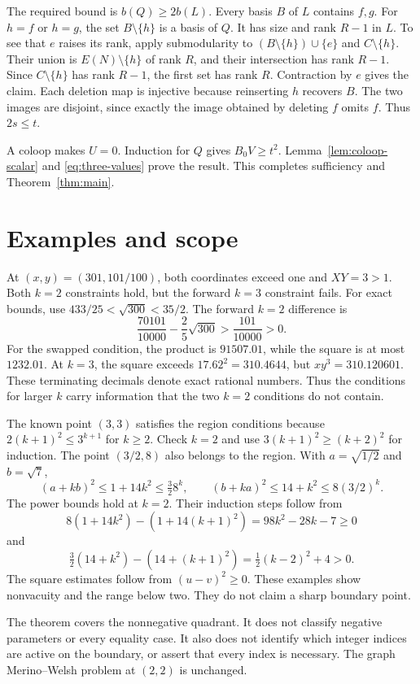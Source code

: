 \documentclass[11pt,a4paper]{article}
\begin{document}
The required bound is $b(Q)\geq2b(L)$. Every basis $B$ of $L$ contains $f,g$.
For $h=f$ or $h=g$, the set $B\setminus\{h\}$ is a basis of $Q$.
It has size and rank $R-1$ in $L$. To see that $e$ raises its rank,
apply submodularity to $(B\setminus\{h\})\cup\{e\}$ and
$C\setminus\{h\}$. Their union is $E(N)\setminus\{h\}$ of rank $R$,
and their intersection has rank $R-1$. Since $C\setminus\{h\}$ has
rank $R-1$, the first set has rank $R$. Contraction by $e$ gives the claim.
Each deletion map is injective because reinserting $h$ recovers $B$.
The two images are disjoint, since exactly the image obtained by deleting
$f$ omits $f$. Thus $2s\leq t$.

A coloop makes $U=0$. Induction for $Q$ gives $B_0V\geq t^2$.
Lemma~\ref{lem:coloop-scalar} and \eqref{eq:three-values} prove the result.
This completes sufficiency and Theorem~\ref{thm:main}.

\section{Examples and scope}\label{sec:examples}
At $(x,y)=(301,101/100)$, both coordinates exceed one and $XY=3>1$.
Both $k=2$ constraints hold, but the forward $k=3$ constraint fails.
For exact bounds, use $433/25<\sqrt{300}<35/2$.
The forward $k=2$ difference is
\[
\frac{70101}{10000}-\frac25\sqrt{300}>\frac{101}{10000}>0.
\]
For the swapped condition, the product is $91507.01$, while the square
is at most $1232.01$. At $k=3$, the square exceeds
$17.62^2=310.4644$, but $xy^3=310.120601$.
These terminating decimals denote exact rational numbers.
Thus the conditions for larger $k$ carry information that the two
$k=2$ conditions do not contain.

The known point $(3,3)$ satisfies the region conditions because
$2(k+1)^2\leq3^{k+1}$ for $k\geq2$. Check $k=2$ and use
$3(k+1)^2\geq(k+2)^2$ for induction. The point $(3/2,8)$ also belongs
to the region. With $a=\sqrt{1/2}$ and $b=\sqrt7$,
\[
(a+kb)^2\leq1+14k^2\leq\tfrac32 8^k,
\qquad (b+ka)^2\leq14+k^2\leq8(3/2)^k.
\]
The power bounds hold at $k=2$. Their induction steps follow from
\[
8(1+14k^2)-(1+14(k+1)^2)=98k^2-28k-7\geq0
\]
and
\[
\tfrac32(14+k^2)-(14+(k+1)^2)=\tfrac12(k-2)^2+4>0.
\]
The square estimates follow from $(u-v)^2\geq0$.
These examples show nonvacuity and the range below two. They do not
claim a sharp boundary point.

The theorem covers the nonnegative quadrant. It does not classify negative
parameters or every equality case. It also does not identify which
integer indices are active on the boundary, or assert that every index
is necessary. The graph Merino--Welsh problem at $(2,2)$ is unchanged.
\end{document}
